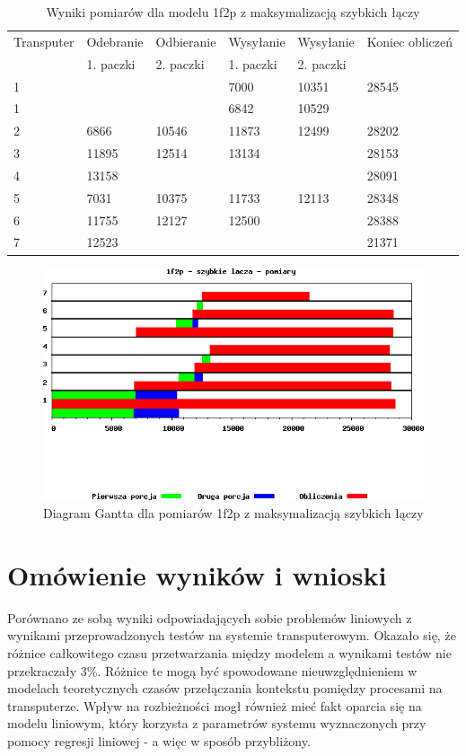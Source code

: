 \documentclass[a4paper,11pt, titlepage]{article}
\begin{document}
\begin{table}[p!]
\begin{tabular}{|l|l|l|l|l|l|}\hline
Transputer&Odebranie&Odbieranie&Wysyłanie&Wysyłanie&Koniec obliczeń\\
&1. paczki&2. paczki&1. paczki&2. paczki&\\ \hline
1&&&7000&10351&28545\\ \hline
1&&&6842&10529&\\ \hline
2&6866&10546&11873&12499&28202\\ \hline
3&11895&12514&13134&&28153\\ \hline
4&13158&&&&28091\\ \hline
5&7031&10375&11733&12113&28348\\ \hline
6&11755&12127&12500&&28388\\ \hline
7&12523&&&&21371\\ \hline
\end{tabular}
\caption{Wyniki pomiarów dla modelu 1f2p z maksymalizacją szybkich łączy \label{i2f1p_l}}
\end{table}
\begin{figure}[hp!]
\includegraphics[width=1.0\textwidth]{wykresy/i2p1f_lacza}
\caption{Diagram Gantta dla pomiarów 1f2p z maksymalizacją szybkich łączy \label{i2p1f_lg}}
\end{figure}
\clearpage
\section{Omówienie wyników  i wnioski}
Porównano ze sobą wyniki odpowiadających sobie problemów liniowych z wynikami przeprowadzonych testów na systemie transputerowym. Okazało się, że różnice całkowitego czasu przetwarzania między modelem a wynikami testów nie przekraczały 3\%. Różnice te mogą być spowodowane nieuwzględnieniem w modelach teoretycznych czasów przełączania kontekstu pomiędzy procesami na transputerze. Wpływ na rozbieżności mogł również mieć fakt oparcia się na modelu liniowym, który korzysta z parametrów systemu wyznaczonych przy pomocy regresji liniowej - a więc w sposób przybliżony.
\end{document}
